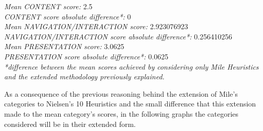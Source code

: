 \noindent \textit{Mean CONTENT score:} 2.5\\
\hspace*{2em} \textit{CONTENT score absolute difference*:} 0\\
\textit{Mean NAVIGATION/INTERACTION score:} 2.923076923\\
\hspace*{2em} \textit{NAVIGATION/INTERACTION score absolute difference*:} 0.256410256\\
\textit{Mean PRESENTATION score:} 3.0625\\
\hspace*{2em} \textit{PRESENTATION score absolute difference*:} 0.0625\\

\textit{*difference between the mean scores achieved by considering only Mile Heuristics and the extended methodology previously explained.}

As a consequence of the previous reasoning behind the extension of Mile’s categories to Nielsen’s 10 Heuristics and the small difference that this extension made to the mean category’s scores, in the following graphs the categories considered will be in their extended form.

